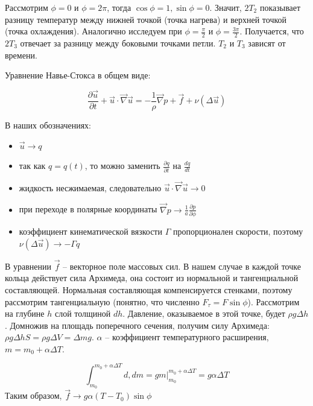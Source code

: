 \documentclass[12pt]{article}
\begin{document}
Рассмотрим $\phi = 0$ и $\phi = 2 \pi$, тогда $\cos\phi = 1, \sin\phi = 0$. Значит, $2T_2$ показывает разницу температур между нижней точкой (точка нагрева) и верхней точкой (точка охлаждения). Аналогично исследуем при $\phi = \frac{\pi}{2}$ и $\phi = \frac{3 \pi}{2}$. Получается, что $2T_3$ отвечает за разницу между боковыми точками петли. $T_2$ и $T_3$ зависят от времени.

Уравнение Навье-Стокса в общем виде:

\begin{equation*}
\frac{\partial \overrightarrow{u}}{\partial t} + \overrightarrow{u} \cdot \overrightarrow{\nabla} \overrightarrow{u} = -\frac{1}{\rho} \overrightarrow{\nabla} p + \overrightarrow{f} + \nu (\Delta \overrightarrow{u})
\end{equation*}

В наших обозначениях:
\begin{itemize}
\item $\overrightarrow{u} \rightarrow q$
\item так как $q=q(t)$, то можно заменить $\frac{\partial q}{\partial t}$ на $\frac{dq}{dt}$
\item жидкость несжимаемая, следовательно $\overrightarrow{u} \cdot \overrightarrow{\nabla} \overrightarrow{u} \rightarrow 0$
\item при переходе в полярные координаты $\overrightarrow{\nabla} p \rightarrow \frac{1}{a} \frac{\partial p}{\partial \phi}$
\item коэффициент кинематической вязкости $\Gamma$ пропорционален скорости, поэтому $\nu (\Delta \overrightarrow{u}) \rightarrow -\Gamma q$
\end{itemize}


В уравнении $\overrightarrow{f}$ -- векторное поле массовых сил. В нашем случае в каждой точке кольца действует сила Архимеда, она состоит из нормальной и тангенциальной составляющей. Нормальная составляющая компенсируется стенками, поэтому рассмотрим тангенциальную (понятно, что численно $F_{\tau} = F\sin\phi$). Рассмотрим на глубине $h$ слой толщиной $dh$. Давление, оказываемое в этой точке, будет $\rho g \Delta h$. Домножив на площадь поперечного сечения, получим силу Архимеда: $\rho g \Delta hS = \rho g \Delta V = \Delta m g$. $\alpha$ -- коэффициент температурного расширения, $m=m_0+\alpha\Delta T$.

\begin{equation*}
\int_{m_0}^{m_0+\alpha\Delta T} d, dm = gm \Big|_{m_0}^{m_0+\alpha\Delta T} = g\alpha\Delta T
\end{equation*}
Таким образом, $\overrightarrow{f} \rightarrow g \alpha (T-T_0) \sin\phi$
\end{document}
